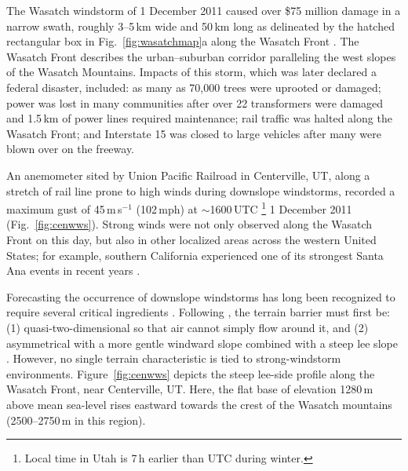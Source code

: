 \documentclass[pdftex,12pt]{article}
\def\mps{m\,s$^{-1}$}
\def\around{$\sim$}
\begin{document}
The Wasatch windstorm of 1 December 2011 caused over \$75 million damage in a narrow swath, roughly 3--5\,km wide and 50\,km long as delineated by the hatched rectangular box in Fig.~\ref{fig:wasatchmap}a along the Wasatch Front \citep{O'Donoghue2012}. The Wasatch Front describes the urban--suburban corridor paralleling the west slopes of the Wasatch Mountains.   Impacts of this storm, which was later declared a federal disaster, included: as many as 70,000 trees were uprooted or damaged; power was lost in many communities after over 22 transformers were damaged and 1.5\,km of power lines required maintenance; rail traffic was halted along the Wasatch Front; and Interstate 15 was closed to large vehicles after many were blown over on the freeway.

An anemometer sited by Union Pacific Railroad in Centerville, UT, along a stretch of rail line prone to high winds during downslope windstorms, recorded a maximum gust of 45\,\mps{} (102\,mph) at \around 1600\,UTC \footnote{Local time in Utah is 7\,h earlier than UTC during winter.} 1 December 2011 (Fig.~\ref{fig:cenwws}). Strong winds were not only observed along the Wasatch Front on this day, but also in other localized areas across the western United States; for example, southern California experienced one of its strongest Santa Ana events in recent years \citep{Welch2011}.

Forecasting the occurrence of downslope windstorms has long been recognized to require several critical ingredients \citep{Smith1985,Markowski2010}. Following \citet{Markowski2010}, the terrain barrier must first be: (1) quasi-two-dimensional so that air cannot simply flow around it, and (2) asymmetrical with a more gentle windward slope combined with a steep lee slope \citep{Miller1991-tf}. However, no single terrain characteristic is tied to strong-windstorm environments. Figure~\ref{fig:cenwws} depicts the steep lee-side profile along the Wasatch Front, near Centerville, UT. Here, the flat base of elevation 1280\,m above mean sea-level rises eastward towards the crest of the Wasatch mountains (2500--2750\,m in this region).

\end{document}
